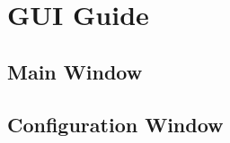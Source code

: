\documentclass[12pt,a4paper]{article}
\begin{document}
\section{GUI Guide}
\subsection{Main Window}

\subsection{Configuration Window}


%
\end{document}

